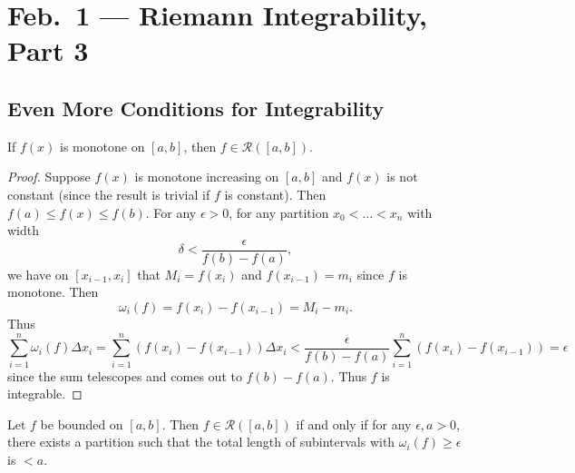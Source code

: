 \chapter{Feb.~1 --- Riemann Integrability, Part 3}

\section{Even More Conditions for Integrability}
\begin{example}
  If $f(x)$ is monotone on $[a, b]$, then
  $f \in \mathcal{R}([a, b])$.
\end{example}

\begin{proof}
  Suppose $f(x)$ is monotone increasing on
  $[a, b]$ and $f(x)$ is not constant (since the result
  is trivial if $f$ is constant). Then
  $f(a) \le f(x) \le f(b)$. For any $\epsilon > 0$,
  for any partition $x_0 < \dots < x_n$ with width
  \[
    \delta < \frac{\epsilon}{f(b) - f(a)},
  \]
  we have on $[x_{i - 1}, x_i]$ that
  $M_i = f(x_i)$ and $f(x_{i - 1}) = m_i$ since
  $f$ is monotone. Then
  \[
    \omega_i(f) = f(x_i) - f(x_{i - 1}) = M_i - m_i.
  \]
  Thus
  \[
    \sum_{i = 1}^n \omega_i(f) \Delta x_i
    = \sum_{i = 1}^n (f(x_i) - f(x_{i - 1})) \Delta x_i
    < \frac{\epsilon}{f(b) - f(a)} \sum_{i = 1}^n (f(x_i) - f(x_{i - 1})) = \epsilon
  \]
  since the sum telescopes and comes out to
  $f(b) - f(a)$. Thus $f$ is integrable.
\end{proof}

\begin{theorem}
  Let $f$ be bounded on $[a, b]$. Then $f \in \mathcal{R}([a, b])$
  if and only if for any $\epsilon, a > 0$,
  there exists a partition such that
  the total length of subintervals with
  $\omega_i(f) \ge \epsilon$ is $< a$.
\end{theorem}

